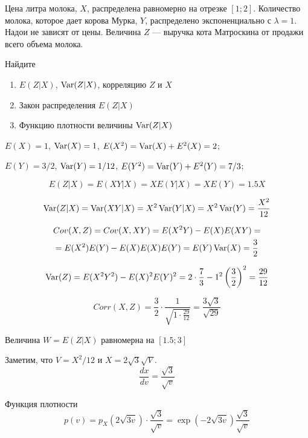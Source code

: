 \begin{problem}
Цена литра молока, $X$, распределена равномерно на отрезке $[1;2]$. Количество молока, которое дает корова Мурка, $Y$, распределено экспоненциально с $\lambda=1$. Надои не зависят от цены. Величина $Z$ — выручка кота Матроскина от продажи всего объема молока.

Найдите
\begin{enumerate}
\item $E(Z|X)$, $\operatorname{Var}(Z|X)$, корреляцию $Z$ и $X$
\item Закон распределения $E(Z|X)$
\item Функцию плотности величины $\operatorname{Var}(Z|X)$
\end{enumerate}

\begin{sol}
 $E(X)=1$, $\operatorname{Var}(X)=1$, $E(X^2)=\operatorname{Var}(X)+E^2(X)=2$;

$E(Y)=3/2$, $\operatorname{Var}(Y)=1/12$, $E(Y^2)=\operatorname{Var}(Y)+E^2(Y)=7/3$;

\begin{equation}
E(Z|X)=E(XY|X)=XE(Y|X)=XE(Y)=1.5X
\end{equation}

\begin{equation}
\operatorname{Var}(Z|X)=\operatorname{Var}(XY|X)=X^2\operatorname{Var}(Y|X)=X^2\operatorname{Var}(Y)=\frac{X^2}{12}
\end{equation}

\begin{multline}
Cov(X,Z)=Cov(X,XY)=E(X^2Y)-E(X)E(XY)=\\
=E(X^2)E(Y)-E(X)E(X)E(Y)=E(Y)\operatorname{Var}(X)=\frac{3}{2}
\end{multline}

\begin{equation}
\operatorname{Var}(Z)=E(X^2Y^2)-E(X)^2E(Y)^2=2\cdot \frac{7}{3}-1^2\left(\frac{3}{2}\right)^2=\frac{29}{12}
\end{equation}

\begin{equation}
Corr(X,Z)=\frac{3}{2}\cdot \frac{1}{\sqrt{1\cdot \frac{29}{12}}}=\frac{3\sqrt{3}}{\sqrt{29}}
\end{equation}

Величина $W=E(Z|X)$ равномерна на $[1.5;3]$

Заметим, что $V=X^{2}/12$ и $X=2\sqrt{3}\sqrt{V}$.
\begin{equation}
\frac{dx}{dv}=\frac{\sqrt{3}}{\sqrt{v}}
\end{equation}

Функция плотности
\begin{equation}
p(v)=p_{X}\left(2\sqrt{3v}\right)\cdot \frac{\sqrt{3}}{\sqrt{v}}=\exp\left(-2\sqrt{3v}\right)\frac{\sqrt{3}}{\sqrt{v}}
\end{equation}
\end{sol}
\end{problem}

